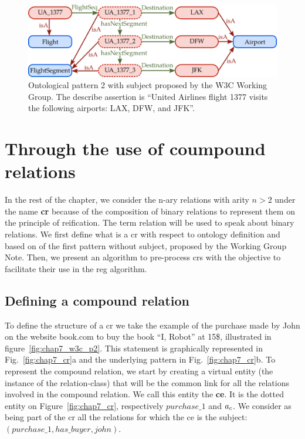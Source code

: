 \begin{figure}[ht!]
\centering
\includegraphics[scale=0.4]{figures/chapter7/w3c_p3.png}
\caption{\label{fig:chap7_w3c_p3} Ontological pattern 2 with subject proposed by the W3C Working Group. The describe assertion is ``United Airlines flight 1377 visits the following airports: LAX, DFW, and JFK''.}
\end{figure}

\section{Through the use of coumpound relations}

In the rest of the chapter, we consider the n-ary relations with arity $n > 2$ under the name \textbf{\acrfull{cr}} because of the composition of binary relations to represent them on the principle of reification. The term relation will be used to speak about binary relations. We first define what is a \acrshort{cr} with respect to ontology definition and based on of the first pattern without subject, proposed by the Working Group Note. Then, we present an algorithm to pre-process \acrfull{cr}s with the objective to facilitate their use in the \acrshort{reg} algorithm.

\subsection{Defining a compound relation}

To define the structure of a \acrlong{cr} we take the example of the purchase made by John on the website book.com to buy the book ``I, Robot'' at 15\$, illustrated in figure~\ref{fig:chap7_w3c_p2}. This statement is graphically represented in Fig.~\ref{fig:chap7_cr}a and the underlying pattern in Fig.~\ref{fig:chap7_cr}b. To represent the compound relation, we start by creating a virtual entity (the instance of the relation-class) that will be the common link for all the relations involved in the compound relation. We call this entity the \textbf{\acrfull{ce}}. It is the dotted entity on Figure~\ref{fig:chap7_cr}, respectively $purchase\_1$ and $a_c$. We consider as being part of the \acrshort{cr} all the relations for which the \acrshort{ce} is the subject: $(purchase\_1, has\_buyer, john)$. 

